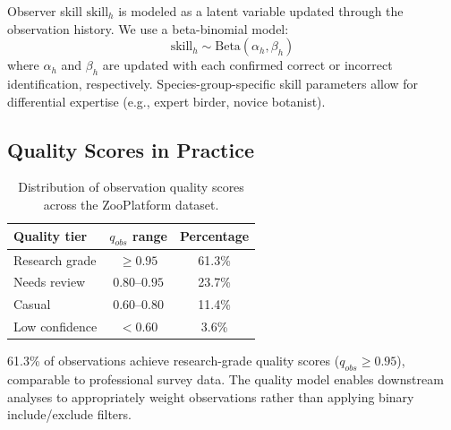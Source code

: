 Observer skill $\text{skill}_h$ is modeled as a latent variable updated
through the observation history. We use a beta-binomial model:
\begin{equation}
  \text{skill}_h \sim \text{Beta}(\alpha_h, \beta_h)
\end{equation}
where $\alpha_h$ and $\beta_h$ are updated with each confirmed
correct or incorrect identification, respectively. Species-group-specific
skill parameters allow for differential expertise (e.g., expert birder,
novice botanist).

\subsection{Quality Scores in Practice}

\begin{table}[H]
\centering
\caption{Distribution of observation quality scores across the
ZooPlatform dataset.}
\label{tab:quality}
\begin{tabular}{lcc}
\toprule
\textbf{Quality tier} & \textbf{$q_{obs}$ range} & \textbf{Percentage} \\
\midrule
Research grade & $\geq 0.95$ & 61.3\% \\
Needs review & $0.80$--$0.95$ & 23.7\% \\
Casual & $0.60$--$0.80$ & 11.4\% \\
Low confidence & $< 0.60$ & 3.6\% \\
\bottomrule
\end{tabular}
\end{table}

61.3\% of observations achieve research-grade quality scores ($q_{obs}
\geq 0.95$), comparable to professional survey data. The quality model
enables downstream analyses to appropriately weight observations rather
than applying binary include/exclude filters.


